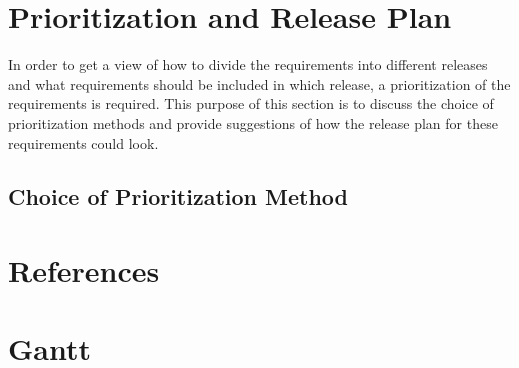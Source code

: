 \documentclass[a4paper,10pt]{article} \usepackage[margin=1.0in]{geometry} \usepackage{pdfpages} \usepackage{graphicx}
\begin{document}
\section{Prioritization and Release Plan}

In order to get a view of how to divide the requirements into different releases and what requirements should be included in which release, a prioritization of the requirements is required. 
This purpose of this section is to discuss the choice of prioritization methods and provide suggestions of how the release plan for these requirements could look.

\subsection{Choice of Prioritization Method}

\newpage
\section{References}
\newpage

\section{Gantt}
\end{document}
